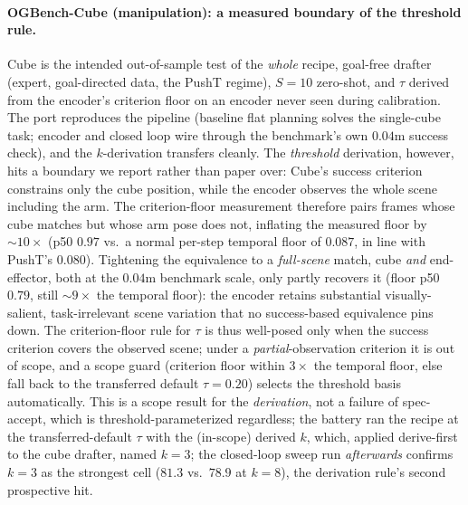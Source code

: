 \documentclass{article}
\begin{document}
\paragraph{OGBench-Cube (manipulation): a measured boundary of the threshold rule.}
Cube is the intended out-of-sample test of the \emph{whole} recipe, goal-free
drafter (expert, goal-directed data, the PushT regime), $S{=}10$ zero-shot, and $\tau$
derived from the encoder's criterion floor on an encoder never seen during
calibration. The port reproduces the pipeline (baseline flat planning solves the
single-cube task; encoder and closed loop wire through the benchmark's own $0.04$m
success check), and the $k$-derivation transfers cleanly. The \emph{threshold}
derivation, however, hits a boundary we report rather than paper over: Cube's success
criterion constrains only the cube position, while the encoder observes the whole
scene including the arm. The criterion-floor measurement therefore pairs frames whose
cube matches but whose arm pose does not, inflating the measured floor by
${\sim}10\times$ (p50 $0.97$ vs.\ a normal per-step temporal floor of $0.087$, in line
with PushT's $0.080$). Tightening the equivalence to a \emph{full-scene} match, cube
\emph{and} end-effector, both at the $0.04$m benchmark scale, only partly recovers it
(floor p50 $0.79$, still ${\sim}9\times$ the temporal floor): the encoder retains
substantial visually-salient, task-irrelevant scene variation that no success-based
equivalence pins down. The criterion-floor rule for $\tau$ is thus well-posed only when
the success criterion covers the observed scene; under a \emph{partial}-observation
criterion it is out of scope, and a scope guard (criterion floor within $3\times$ the
temporal floor, else fall back to the transferred default $\tau{=}0.20$) selects the
threshold basis automatically. This is a scope result for the \emph{derivation}, not a
failure of spec-accept, which is threshold-parameterized regardless; the battery ran
the recipe at the transferred-default $\tau$ with the (in-scope) derived $k$, which, applied derive-first to the cube drafter, named $k{=}3$; the closed-loop sweep
run \emph{afterwards} confirms $k{=}3$ as the strongest cell ($81.3$ vs.\ $78.9$ at
$k{=}8$), the derivation rule's second prospective hit.
\end{document}
